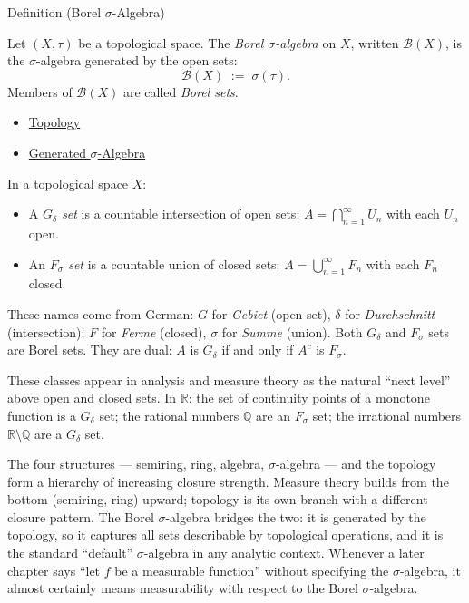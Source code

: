 \begin{definitionbox}{Definition (Borel $\sigma$-Algebra)}
\begin{definition}\label{def:borel}
Let $(X, \tau)$ be a topological space. The \emph{Borel $\sigma$-algebra}
on $X$, written $\mathcal{B}(X)$, is the $\sigma$-algebra generated by the
open sets:
\[
\mathcal{B}(X) \;:=\; \sigma(\tau).
\]
Members of $\mathcal{B}(X)$ are called \emph{Borel sets}.
\end{definition}
\end{definitionbox}

\begin{dependencies}
\begin{itemize}
  \item \hyperref[def:topology-defn]{Topology}
  \item \hyperref[def:generated-sigma]{Generated $\sigma$-Algebra}
\end{itemize}
\end{dependencies}

\begin{example*}
\label{ex:Fsigma-Gdelta}
In a topological space $X$:
\begin{itemize}
\item A \emph{$G_\delta$ set} is a countable intersection of open sets:
  $A = \bigcap_{n=1}^\infty U_n$ with each $U_n$ open.
\item An \emph{$F_\sigma$ set} is a countable union of closed sets:
  $A = \bigcup_{n=1}^\infty F_n$ with each $F_n$ closed.
\end{itemize}
These names come from German: $G$ for \emph{Gebiet} (open set), $\delta$ for
\emph{Durchschnitt} (intersection); $F$ for \emph{Ferme} (closed), $\sigma$
for \emph{Summe} (union). Both $G_\delta$ and $F_\sigma$ sets are Borel sets.
They are dual: $A$ is $G_\delta$ if and only if $A^c$ is $F_\sigma$.

These classes appear in analysis and measure theory as the natural ``next
level'' above open and closed sets. In $\mathbb{R}$: the set of continuity
points of a monotone function is a $G_\delta$ set; the rational numbers
$\mathbb{Q}$ are an $F_\sigma$ set; the irrational numbers $\mathbb{R}
\setminus \mathbb{Q}$ are a $G_\delta$ set.
\end{example*}

\begin{remark*}[Transition]
The four structures — semiring, ring, algebra, $\sigma$-algebra — and the
topology form a hierarchy of increasing closure strength. Measure theory
builds from the bottom (semiring, ring) upward; topology is its own branch
with a different closure pattern. The Borel $\sigma$-algebra bridges the two:
it is generated by the topology, so it captures all sets describable by
topological operations, and it is the standard ``default'' $\sigma$-algebra
in any analytic context. Whenever a later chapter says ``let $f$ be a
measurable function'' without specifying the $\sigma$-algebra, it almost
certainly means measurability with respect to the Borel $\sigma$-algebra.
\end{remark*}
